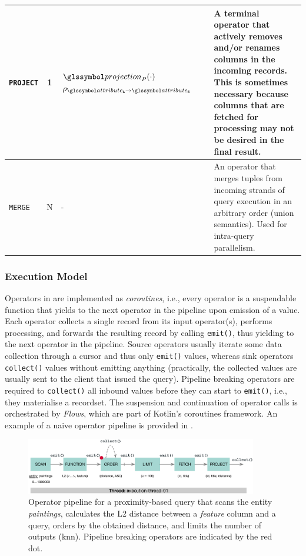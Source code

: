 \begin{table}
\begin{tabular}{| l || c | p{30mm}  | c | p{70mm} |}
        \hline
        \texttt{PROJECT} & 1 & $\projection_{P}(\cdot)$ \newline $\rho_{\attribute_\mathtt{A} \rightarrow \attribute_\mathtt{B}}$ & & A terminal operator that actively removes and/or renames columns in the incoming records. This is sometimes necessary because columns that are fetched for processing may not be desired in the final result. \\ 
        \hline
        \texttt{MERGE} & N & - & & An operator that merges tuples from incoming strands of query execution in an arbitrary order (union semantics). Used for intra-query parallelism. \\ 
        \hline
        \hline
    \end{tabular}  
\end{table}

\subsubsection{Execution Model}

Operators in \cottontail{} are implemented as \emph{coroutines}, i.e., every operator is a suspendable function that yields to the next operator in the pipeline upon emission of a value. Each operator collects a single record from its input operator(s), performs processing, and forwards the resulting record by calling \texttt{emit()}, thus yielding to the next operator in the pipeline. Source operators usually iterate some data collection through a cursor and thus only \texttt{emit()} values, whereas sink operators \texttt{collect()} values without emitting anything (practically, the collected values are usually sent to the client that issued the query). Pipeline breaking operators are required to \texttt{collect()} all inbound values before they can start to \texttt{emit()}, i.e., they materialise a recordset. The suspension and continuation of operator calls is orchestrated by \emph{Flows}, which are part of Kotlin's coroutines framework. An example of a naive operator pipeline is provided in . 

\begin{figure}[bt]
    \centering
    \includegraphics[width=0.9\textwidth]{figures/execution-model-simple}
    \caption{Operator pipeline for a proximity-based query that scans the entity \emph{paintings}, calculates the L2 distance between a \emph{feature} column and a query, orders by the obtained distance, and limits the number of outputs (\acrshort{knn}). Pipeline breaking operators are indicated by the red dot.}
    \label{figure:cottontail_execution_model_simple}
\end{figure}

